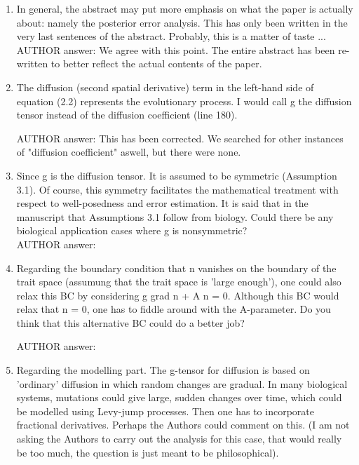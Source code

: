 \documentclass[a4paper,11pt]{scrartcl}
\begin{document}
\begin{enumerate}
\item
In general, the abstract may put more emphasis on what the paper is actually about: namely the posterior error analysis. This has only been written in the very last sentences of the abstract. Probably, this is a matter of taste ... \\

AUTHOR answer: We agree with this point. The entire abstract has been re-written to better reflect the actual contents of the paper.

\item
The diffusion (second spatial derivative) term in the left-hand side of equation (2.2) represents the evolutionary process. I would call g the diffusion tensor instead of the diffusion coefficient (line 180).

AUTHOR answer: This has been corrected. We searched for other instances of "diffusion coefficient" aswell, but there were none.

\item
Since g is the diffusion tensor. It is assumed to be symmetric (Assumption 3.1). Of course, this symmetry facilitates the mathematical treatment with respect to well-posedness and error estimation. It is said that in the manuscript that Assumptions 3.1 follow from biology. Could there be any biological application cases where g is nonsymmetric? \\

AUTHOR answer:

\item
Regarding the boundary condition that n vanishes on the boundary of the trait space (assumung that the trait space is 'large enough'), one could also relax this BC by considering g grad n + A n = 0. Although this BC would relax that n = 0, one has to fiddle around with the A-parameter. Do you think that this alternative BC could do a better job?

AUTHOR answer:

\item
Regarding the modelling part. The g-tensor for diffusion is based on 'ordinary' diffusion in which random changes are gradual. In many biological systems, mutations could give large, sudden changes over time, which could be modelled using Levy-jump processes. Then one has to incorporate fractional derivatives. Perhaps the Authors could comment on this. (I am not asking the Authors to carry out the analysis for this case, that would really be too much, the question is just meant to be philosophical).


\end{enumerate}
\end{document}
